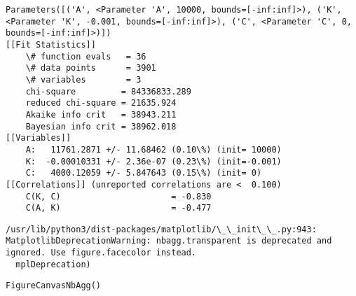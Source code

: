 \documentclass[11pt]{article}
\begin{document}
    \begin{Verbatim}[commandchars=\\\{\}]
Parameters([('A', <Parameter 'A', 10000, bounds=[-inf:inf]>), ('K', <Parameter 'K', -0.001, bounds=[-inf:inf]>), ('C', <Parameter 'C', 0, bounds=[-inf:inf]>)])
[[Fit Statistics]]
    \# function evals   = 36
    \# data points      = 3901
    \# variables        = 3
    chi-square         = 84336833.289
    reduced chi-square = 21635.924
    Akaike info crit   = 38943.211
    Bayesian info crit = 38962.018
[[Variables]]
    A:   11761.2871 +/- 11.68462 (0.10\%) (init= 10000)
    K:  -0.00010331 +/- 2.36e-07 (0.23\%) (init=-0.001)
    C:   4000.12059 +/- 5.847643 (0.15\%) (init= 0)
[[Correlations]] (unreported correlations are <  0.100)
    C(K, C)                      = -0.830 
    C(A, K)                      = -0.477 

    \end{Verbatim}

    \begin{Verbatim}[commandchars=\\\{\}]
/usr/lib/python3/dist-packages/matplotlib/\_\_init\_\_.py:943: MatplotlibDeprecationWarning: nbagg.transparent is deprecated and ignored. Use figure.facecolor instead.
  mplDeprecation)

    \end{Verbatim}

    
    \begin{verbatim}
FigureCanvasNbAgg()
    \end{verbatim}
\end{document}
